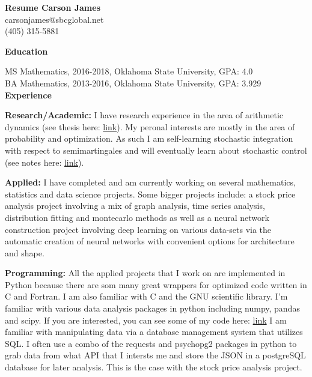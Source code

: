 \documentclass[12pt]{amsart}
\newcommand{\n}{\noindent}
\begin{document}
\textbf{\hspace{7cm}\large Resume \hspace{4cm} \large Carson James}\\ \phantom{1} \hspace{13cm} carsonjames@sbcglobal.net\\ \phantom{1} \hspace{13.9cm} (405) 315-5881


\n\textbf{\large Education} \vspace{2mm}

\n MS Mathematics, 2016-2018, Oklahoma State University, GPA: 4.0\\
\n BA Mathematics, 2013-2016, Oklahoma State University, GPA: 3.929 \vspace{.5mm}\\

 \n \textbf{\large Experience} \vspace{2mm}

\n \textbf{Research/Academic:}
I have research experience in the area of arithmetic dynamics (see thesis here: \textcolor{blue}{ \href{https://github.com/carsonaj/Math/blob/master/Arithmetic\%20Dynamics/Arithmetic\%20Dynamics\%20Notes.pdf}{link}}). My peronal interests are mostly in the area of probability and optimization. As such I am self-learning stochastic integration with respect to semimartingales and will eventually learn about stochastic control (see notes here: \textcolor{blue}{ \href{https://github.com/carsonaj/Math/blob/master/Stochastic\%20Analysis/Stochastic\%20Processes\%20-\%20James.pdf}{link}}). \vspace{2mm}


\n  \textbf{Applied:} I have completed and am currently working on several mathematics, statistics and data science projects. Some bigger projects include: a stock price analysis project involving a mix of graph analysis, time series analysis, distribution fitting and montecarlo methods as well as a neural network construction project involving deep learning on various data-sets via the automatic creation of neural networks with convenient options for architecture and shape. \vspace{2mm}

\n \textbf{Programming:} All the applied projects that I work on are implemented in Python because there are som many great wrappers for optimized code written in C and Fortran. I am also familiar with C and the GNU scientific library. I'm familiar with various data analysis packages in python including numpy, pandas and scipy. If you are interested, you can see some of my code here: \textcolor{blue}{ \href{https://github.com/carsonaj/Programming}{link}} I am familiar with manipulating data via a database management system that utilizes SQL. I often use a combo of the requests and psychopg2 packages in python to grab data from what API that I intersts me and store the JSON in a postgreSQL database for later analysis. This is the case with the stock price analysis project. \vspace{2mm}
\end{document}
